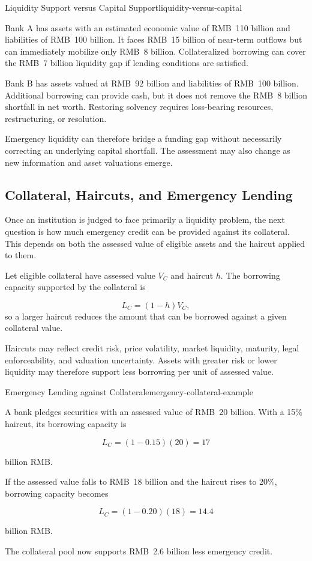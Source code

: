 \begin{example}{Liquidity Support versus Capital Support}{liquidity-versus-capital}

Bank A has assets with an estimated economic value of RMB~110 billion and liabilities of RMB~100 billion. It faces RMB~15 billion of near-term outflows but can immediately mobilize only RMB~8 billion. Collateralized borrowing can cover the RMB~7 billion liquidity gap if lending conditions are satisfied.

Bank B has assets valued at RMB~92 billion and liabilities of RMB~100 billion. Additional borrowing can provide cash, but it does not remove the RMB~8 billion shortfall in net worth. Restoring solvency requires loss-bearing resources, restructuring, or resolution.

\end{example}

Emergency liquidity can therefore bridge a funding gap without necessarily correcting an underlying capital shortfall. The assessment may also change as new information and asset valuations emerge.


\subsection{Collateral, Haircuts, and Emergency Lending}

Once an institution is judged to face primarily a liquidity problem, the next question is how much emergency credit can be provided against its collateral. This depends on both the assessed value of eligible assets and the haircut applied to them.

Let eligible collateral have assessed value \(V_C\) and haircut \(h\). The borrowing capacity supported by the collateral is

\begin{equation}
L_C=(1-h)V_C,
\label{eq:ch22-collateral-lending}
\end{equation}
so a larger haircut reduces the amount that can be borrowed against a given collateral value.

Haircuts may reflect credit risk, price volatility, market liquidity, maturity, legal enforceability, and valuation uncertainty. Assets with greater risk or lower liquidity may therefore support less borrowing per unit of assessed value.

\begin{example}{Emergency Lending against Collateral}{emergency-collateral-example}

A bank pledges securities with an assessed value of RMB~20 billion. With a 15\% haircut, its borrowing capacity is

$$
L_C=(1-0.15)(20)=17
$$

billion RMB.

If the assessed value falls to RMB~18 billion and the haircut rises to 20\%, borrowing capacity becomes

$$
L_C=(1-0.20)(18)=14.4
$$

billion RMB.

The collateral pool now supports RMB~2.6 billion less emergency credit.

\end{example}

